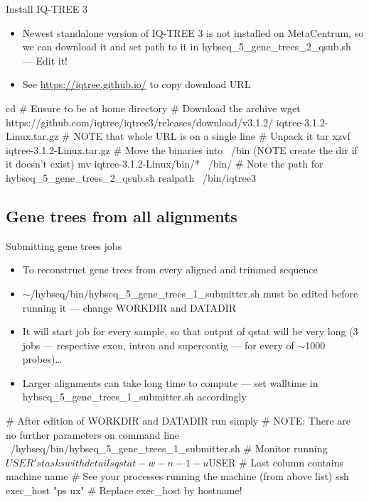 \documentclass[compress,  xelatex, 11pt, xcolor=x11names, aspectratio=169,
	hyperref={
		bookmarks=true,
		unicode=true,
		colorlinks=true,
		pdftitle={HybSeq course},
		plainpages=false,
		pdfauthor={Vojtech Zeisek},
		pdfsubject={Practical processing of HybSeq target enrichment sequencing data on computing grids like MetaCentrum},
		pdfcreator={XeLaTeX},
		pdfkeywords={BASH, command line, GNU, HybSeq, Linux, MetaCentrum, sequencing shell, target enrichment},
		linkcolor=Turquoise4, %
		anchorcolor=DodgerBlue4, %
		citecolor=DodgerBlue4, %
		filecolor=DodgerBlue4, %
		menucolor=Tan4, %
		urlcolor=DarkOliveGreen4 %
		},
	url={hyphens, lowtilde} %
	]{beamer}
\renewcommand{\texttt}[1]{\colorbox{Cornsilk2}{{\ttfamily #1}}}
\renewcommand{\alert}[1]{\textcolor{OrangeRed3}{#1}}
\begin{document}
\begin{frame}[fragile]{Install IQ-TREE 3}
	\begin{itemize}
		\item Newest standalone version of IQ-TREE 3 is not installed on MetaCentrum, so we can download it and set path to it in \texttt{hybseq\_5\_gene\_trees\_2\_qsub.sh} --- \alert{Edit it!}
		\item See \url{https://iqtree.github.io/} to copy download URL
	\end{itemize}
	\begin{bashcode}
    cd # Ensure to be at home directory
    # Download the archive
    wget https://github.com/iqtree/iqtree3/releases/download/v3.1.2/
      iqtree-3.1.2-Linux.tar.gz # NOTE that whole URL is on a single line
    # Unpack it
    tar xzvf iqtree-3.1.2-Linux.tar.gz
    # Move the binaries into ~/bin (NOTE create the dir if it doesn't exist)
    mv iqtree-3.1.2-Linux/bin/* ~/bin/
    # Note the path for hybseq_5_gene_trees_2_qsub.sh
    realpath ~/bin/iqtree3
	\end{bashcode}
\end{frame}

\subsection{Gene trees from all alignments}

\begin{frame}[fragile]{Submitting gene trees jobs}
	\begin{itemize}
		\item To reconstruct gene trees from every aligned and trimmed sequence
		\item \alert{\texttt{$\sim$/hybseq/bin/hybseq\_5\_gene\_trees\_1\_submitter.sh} must be edited before running it --- change \texttt{WORKDIR} and \texttt{DATADIR}}
		\item It will start job for every sample, so that output of \texttt{qstat} will be very long (3 jobs --- respective exon, intron and supercontig --- for every of $\sim$1000 probes)\ldots
		\item Larger alignments can take long time to compute --- set \texttt{walltime} in \texttt{hybseq\_5\_gene\_trees\_1\_submitter.sh} accordingly
	\end{itemize}
	\begin{bashcode}
    # After edition of WORKDIR and DATADIR run simply
    # NOTE: There are no further parameters on command line
    ~/hybseq/bin/hybseq_5_gene_trees_1_submitter.sh
    # Monitor running $USER's tasks with details
    qstat -w -n -1 -u $USER # Last column contains machine name
    # See your processes running the machine (from above list)
    ssh exec_host "ps ux" # Replace exec_host by hostname!
	\end{bashcode}
\end{frame}
\end{document}
